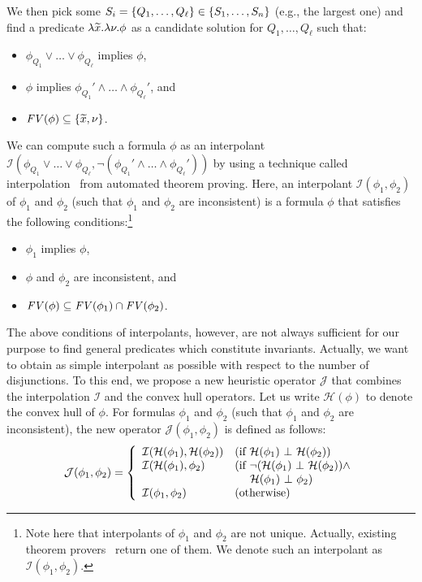 We then pick some \(S_i = \{{Q_1,\dots,Q_{\ell}}\} \in 
\{{S_1,\dots,S_n}\}\) (e.g., the largest one) and find a predicate 
\(\lambda\widetilde{x}.\lambda \nu.\phi\) as a candidate solution for 
\(Q_1,\dots,Q_{\ell}\) such that:
\begin{itemize}
\item \(\phi_{Q_1} \lor \dots \lor \phi_{Q_{\ell}}\) implies \(\phi\),
\item \(\phi\) implies \(\phi_{Q_1}' \land \dots \land \phi_{Q_{\ell}}'\), and
\item \(\mathit{FV}({\phi}) \subseteq \{{\widetilde{x},\nu}\}\).
\end{itemize}
We can compute such a formula \(\phi\) as an interpolant 
\(\mathcal{I}(\phi_{Q_1} \lor \dots \lor \phi_{Q_{\ell}},\neg 
(\phi_{Q_1}' \land \dots \land \phi_{Q_{\ell}}'))\) by using a technique 
called interpolation~\cite{Henzinger2004,McMillan2005} from automated 
theorem proving.  Here, an interpolant \(\mathcal{I}(\phi_1,\phi_2)\) of 
\(\phi_1\) and \(\phi_2\) (such that \(\phi_1\) and \(\phi_2\) are 
inconsistent) is a formula \(\phi\) that satisfies the following 
conditions:\footnote{Note here that interpolants of \(\phi_1\) and 
\(\phi_2\) are not unique.  Actually, existing theorem 
provers~\cite{Henzinger2004,McMillan2005,Beyer2008} return one of them.  
We denote such an interpolant as \(\mathcal{I}(\phi_1,\phi_2)\).}
\begin{itemize}
\item \(\phi_1\) implies \(\phi\),
\item \(\phi\) and \(\phi_2\) are inconsistent, and
\item \(\mathit{FV}({\phi}) \subseteq \mathit{FV}({\phi_1}) \cap \mathit{FV}({\phi_2})\).
\end{itemize}
The above conditions of interpolants, however, are not always sufficient 
for our purpose to find general predicates which constitute invariants.  
Actually, we want to obtain as simple interpolant as possible with 
respect to the number of disjunctions.
To this end, we propose a new heuristic operator \(\mathcal{J}\) that 
combines the interpolation \(\mathcal{I}\) and the convex hull operators. 
 Let us write \(\mathcal{H}(\phi)\) to denote the convex hull of \(\phi\). 
 For formulas \(\phi_1\) and \(\phi_2\) (such that \(\phi_1\) and 
\(\phi_2\) are inconsistent), the new operator 
\(\mathcal{J}(\phi_1,\phi_2)\) is defined as follows:
\begin{eqnarray*}
\mathcal{J}(\phi_1,\phi_2) =
\left\{
\begin{array}{ll}
\mathcal{I}(\mathcal{H}(\phi_1),\mathcal{H}(\phi_2)) & (\mbox{if~}\mathcal{H}(\phi_1) \ \bot\  \mathcal{H}(\phi_2)) \\
\mathcal{I}(\mathcal{H}(\phi_1),\phi_2) & (\mbox{if~}\neg (\mathcal{H}(\phi_1) \ \bot\  \mathcal{H}(\phi_2)) \land \\
&\ \quad \mathcal{H}(\phi_1) \ \bot\  \phi_2) \\
\mathcal{I}(\phi_1,\phi_2) & (\mbox{otherwise})
\end{array}
\right.
\end{eqnarray*}
